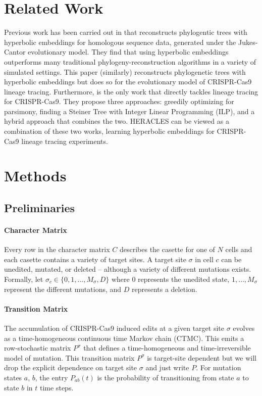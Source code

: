 \documentclass{article}
\begin{document}
\section{Related Work}


Previous work has been carried out in \cite{wilson2021learning} that reconstructs phylogentic trees with hyperbolic embeddings for homologous sequence data, generated under the Jukes-Cantor evolutionary model. They find that using hyperbolic embeddings outperforms many traditional phylogeny-reconstruction algorithms in a variety of simulated settings. This paper (similarly) reconstructs phylogenetic trees with hyperbolic embeddings but does so for the evolutionary model of CRISPR-Cas9 lineage tracing. Furthermore, \cite{jones2020inference} is the only work that directly tackles lineage tracing for CRISPR-Cas9. They propose three approaches: greedily optimizing for parsimony, finding a Steiner Tree with Integer Linear Programming (ILP), and a hybrid approach that combines the two. HERACLES can be viewed as a combination of these two works, learning hyperbolic embeddings for CRISPR-Cas9 lineage tracing experiments.


\section{Methods}


\subsection{Preliminaries}

\paragraph*{Character Matrix} Every row in the character matrix $C$ describes the casette for one of $N$ cells and each casette contains a variety of target sites. A target site $\sigma$ in cell $c$ can be unedited, mutated, or deleted -- although a variety of different mutations exists. Formally, let $\sigma_c \in \{0, 1, \ldots, M_\sigma, D \}$ where $0$ represents the unedited state, $1, \ldots, M_\sigma$ represent the different mutations, and $D$ represents a deletion.

\paragraph*{Transition Matrix} The accumulation of CRISPR-Cas9 induced edits at a given target site $\sigma$ evolves as a time-homogeneous continuous time Markov chain (CTMC). This emits a row-stochastic matrix $P^\sigma$ that defines a time-homogeneous and time-irreversible model of mutation. This transition matrix $P^\sigma$ is target-site dependent but we will drop the explicit dependence on target site $\sigma$ and just write $P$. For mutation states $a$, $b$, the entry $P_{ab}(t)$ is the probability of transitioning from state $a$ to state $b$ in $t$ time steps.
\end{document}
